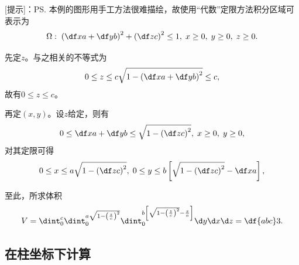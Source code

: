 [提示]：\ps{本例的图形用手工方法很难描绘，故使用“代数”定限方法}积分区域可表示为
$$\Omega:\;\left(\df xa+\df yb\right)^2+\left(\df zc\right)^2\leq1,\;
x\geq0,\;y\geq0,\;z\geq0.$$

先定$z$。与之相关的不等式为
$$0\leq z\leq c\sqrt{1-\left(\df xa+\df yb\right)^2}\leq c,$$
故有$0\leq z\leq c$。

再定$(x,y)$。设$z$给定，则有
$$0\leq\df xa+\df yb\leq\sqrt{1-\left(\df zc\right)^2},
\;x\geq0,\;y\geq0,$$
对其定限可得
$$0\leq x\leq a\sqrt{1-\left(\df zc\right)^2},\;
0\leq y\leq b\left[\sqrt{1-\left(\df zc\right)^2}-\df xa\right],$$

至此，所求体积
$$V=\dint_0^c\dint_0^{a\sqrt{1-\left(\frac zc\right)^2}}
\dint_0^{b\left[\sqrt{1-\left(\frac zc\right)^2}-\frac xa\right]}
\d y\d x\d z=\df{abc}3.$$

\subsection{在柱坐标下计算}

